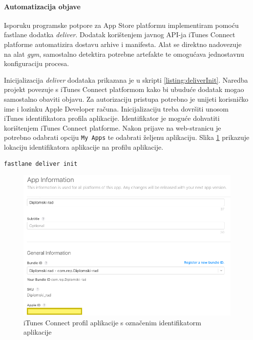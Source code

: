 \documentclass[times, utf8, diplomski, numeric]{fer}
\begin{document}
\paragraph{Automatizacija objave}

Isporuku programske potpore za App Store platformu implementiram pomoću fastlane dodatka \textit{deliver}\citep{fastlane:deliver}. Dodatak korištenjem javnog API-ja iTunes Connect platforme automatizira dostavu arhive i manifesta. Alat se direktno nadovezuje na alat \textit{gym}, samostalno detektira potrebne artefakte te omogućava jednostavnu konfiguraciju procesa.

Inicijalizacija \textit{deliver} dodataka prikazana je u skripti \ref{listing:deliverInit}. Naredba projekt povezuje s iTunes Connect platformom kako bi ubuduće dodatak mogao samostalno obaviti objavu. Za autorizaciju pristupa potrebno je unijeti korisničko ime i lozinku Apple Developer računa. Inicijalizaciju treba dovršiti unosom iTunes identifikatora profila aplikacije. Identifikator je moguće dohvatiti korištenjem iTunes Connect platforme. Nakon prijave na web-stranicu  je potrebno odabrati opciju \verb|My Apps| te odabrati željenu aplikaciju. Slika \ref{fig:iTunesConnectAppId} prikazuje lokaciju identifikatora aplikacije na profilu aplikacije.

\begin{lstlisting}[caption=Inicijalizacija deliver dodatka, label=listing:deliverInit]
fastlane deliver init
\end{lstlisting}

\begin{figure}
\centering
\includegraphics[scale=0.45]{iTunesConnectAppId}
\caption{iTunes Connect profil aplikacije s označenim identifikatorm aplikacije}
\label{fig:iTunesConnectAppId}
\end{figure}
\end{document}
